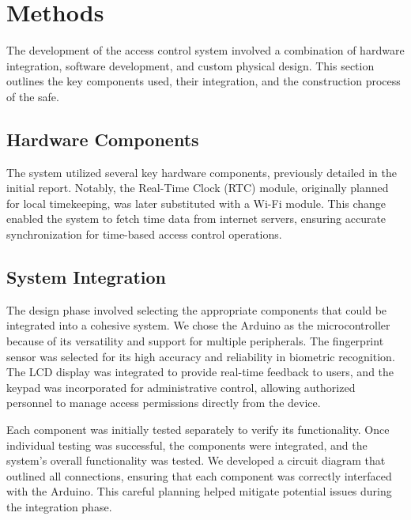 \documentclass{article}
\begin{document}
    
\newpage
\section{Methods}
The development of the access control system involved a combination of hardware integration, software development, and custom physical design. This section outlines the key components used, their integration, and the construction process of the safe.

\subsection{Hardware Components}
The system utilized several key hardware components, previously detailed in the initial report. Notably, the Real-Time Clock (RTC) module, originally planned for local timekeeping, was later substituted with a Wi-Fi module. This change enabled the system to fetch time data from internet servers, ensuring accurate synchronization for time-based access control operations.


\subsection{System Integration}
The design phase involved selecting the appropriate components that could be integrated into a cohesive system. We chose the Arduino as the microcontroller because of its versatility and support for multiple peripherals. The fingerprint sensor was selected for its high accuracy and reliability in biometric recognition. The LCD display was integrated to provide real-time feedback to users, and the keypad was incorporated for administrative control, allowing authorized personnel to manage access permissions directly from the device.

Each component was initially tested separately to verify its functionality. Once individual testing was successful, the components were integrated, and the system's overall functionality was tested. We developed a circuit diagram that outlined all connections, ensuring that each component was correctly interfaced with the Arduino. This careful planning helped mitigate potential issues during the integration phase.
\end{document}
